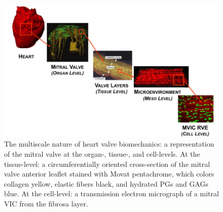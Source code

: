 \begin{figure}
\centering
\includegraphics[width=\textwidth]{Images/chapter1/multiscalevalve.png}
\caption{The multiscale nature of heart valve biomechanics: a representation of the mitral valve at the organ-, tissue-, and cell-levels. At the tissue-level: a circumferentially oriented cross-section of the mitral valve anterior leaflet stained with Movat pentachrome, which colors collagen yellow, elastic fibers black, and hydrated PGs and GAGs blue. At the cell-level: a transmission electron micrograph of a mitral VIC from the fibrosa layer. \cite{salma_heart_2016}}
\label{fig:multiscalevalve}
\end{figure}


